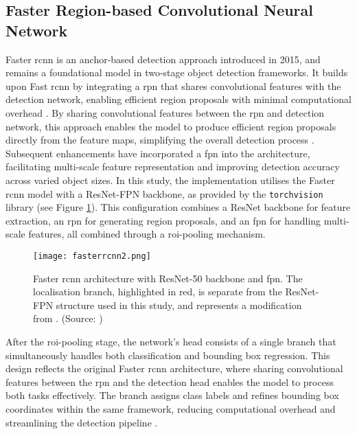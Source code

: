 \subsection{Faster Region-based Convolutional Neural Network}
\label{subsec:4_fastercnn}

Faster \gls{rcnn} \cite{fasterrcnn} is an anchor-based detection approach introduced in 2015, and remains a foundational model in two-stage object detection frameworks. It builds upon Fast \gls{rcnn} \cite{fastrcnn} by integrating a \gls{rpn} that shares convolutional features with the detection network, enabling efficient region proposals with minimal computational overhead \cite{fasterrcnn}. By sharing convolutional features between the \gls{rpn} and detection network, this approach enables the model to produce efficient region proposals directly from the feature maps, simplifying the overall detection process \cite{fasterrcnn}.
Subsequent enhancements have incorporated a \gls{fpn} into the architecture, facilitating multi-scale feature representation and improving detection accuracy across varied object sizes. In this study, the implementation utilises the Faster \gls{rcnn} model with a ResNet-FPN backbone, as provided by the \verb|torchvision| library (see Figure \ref{fig:fasterrcnn2}). This configuration combines a ResNet backbone for feature extraction, an \gls{rpn} for generating region proposals, and an \gls{fpn} for handling multi-scale features, all combined through a \gls{roi}-pooling mechanism.

\begin{figure}[!htbp]
    \centering
    \texttt{[image: fasterrcnn2.png]}
    \caption{Faster \gls{rcnn} architecture with ResNet-50 backbone and \gls{fpn}. The localisation branch, highlighted in red, is separate from the ResNet-FPN structure used in this study, and represents a modification from \cite{fasterrcnn_diagram}. (Source: \cite{fasterrcnn_diagram})}
    \label{fig:fasterrcnn2}
\end{figure}

After the \gls{roi}-pooling stage, the network’s head consists of a single branch that simultaneously handles both classification and bounding box regression. This design reflects the original Faster \gls{rcnn} architecture, where sharing convolutional features between the \gls{rpn} and the detection head enables the model to process both tasks effectively. The branch assigns class labels and refines bounding box coordinates within the same framework, reducing computational overhead and streamlining the detection pipeline \cite{fasterrcnn}.

